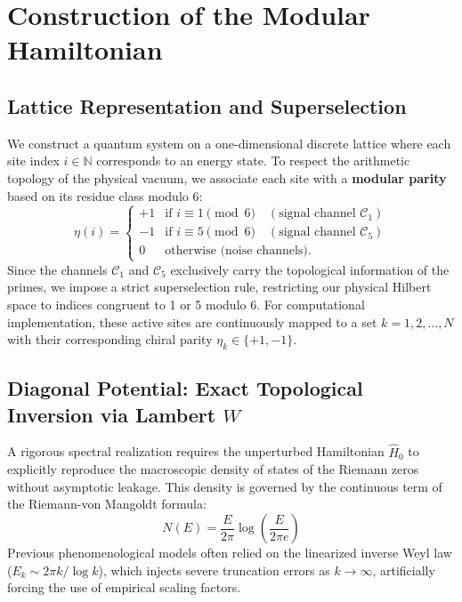 \documentclass[aps,prl,preprint,superscriptaddress,floatfix]{revtex4-2}
\begin{document}
\section{Construction of the Modular Hamiltonian}

\subsection{Lattice Representation and Superselection}

We construct a quantum system on a one-dimensional discrete lattice where each site index $i \in \mathbb{N}$ corresponds to an energy state. To respect the arithmetic topology of the physical vacuum, we associate each site with a \textbf{modular parity} based on its residue class modulo 6:
\begin{equation}
\eta(i) = \begin{cases}
+1 & \text{if } i \equiv 1 \pmod 6 \quad (\text{signal channel } \mathcal{C}_1)\\
-1 & \text{if } i \equiv 5 \pmod 6 \quad (\text{signal channel } \mathcal{C}_5)\\
0 & \text{otherwise (noise channels)}.
\end{cases}
\end{equation}
Since the channels $\mathcal{C}_1$ and $\mathcal{C}_5$ exclusively carry the topological information of the primes, we impose a strict superselection rule, restricting our physical Hilbert space to indices congruent to 1 or 5 modulo 6. For computational implementation, these active sites are continuously mapped to a set $k = 1,2,\dots,N$ with their corresponding chiral parity $\eta_k \in \{+1,-1\}$.

\subsection{Diagonal Potential: Exact Topological Inversion via Lambert \texorpdfstring{$W$}{W}}

A rigorous spectral realization requires the unperturbed Hamiltonian $\hat{H}_0$ to explicitly reproduce the macroscopic density of states of the Riemann zeros without asymptotic leakage. This density is governed by the continuous term of the Riemann-von Mangoldt formula:
\begin{equation}
N(E) = \frac{E}{2\pi} \log\left(\frac{E}{2\pi e}\right)
\end{equation}
Previous phenomenological models often relied on the linearized inverse Weyl law ($E_k \sim 2\pi k / \log k$), which injects severe truncation errors as $k \to \infty$, artificially forcing the use of empirical scaling factors. 
\end{document}
